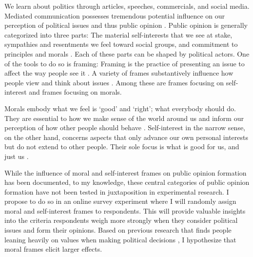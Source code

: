 \documentclass[11pt]{article}
\begin{document}
We learn about politics through articles, speeches, commercials, and social media. Mediated communication possesses tremendous potential influence on our perception of political issues and thus public opinion \citep{iyengar_framing_1996,kam_risk_2010}. Public opinion is generally categorized into three parts: The material self-interests that we see at stake, sympathies and resentments we feel toward social groups, and commitment to principles and morals \citep{kinder_1998_opinion}. Each of these parts can be shaped by political actors. One of the tools to do so is framing: Framing is the practice of presenting an issue to affect the way people see it \citep{aaroe_investigating_2011,druckman_evaluating_2001}. A variety of frames substantively influence how people view and think about issues \citep{entman_projections_2004,slothuus_political_2010,sniderman_structure_2004,chong_framing_2007-1}. Among these are frames focusing on self-interest and frames focusing on morals.

Morals embody what we feel is `good' and `right'; what everybody should do. They are essential to how we make sense of the world around us and inform our perception of how other people should behave \citep{frank_whats_2005,mooney_public_2001,zaller_nature_1992,haidt_moral_2003}. Self-interest in the narrow sense, on the other hand, concerns aspects that only advance our own personal interests but do not extend to other people. Their sole focus is what is good for us, and just us \citep{brewer_value_2001,skitka_psychology_2010,caprara_2006_personality,converse_nature_1964}. 


While the influence of moral and self-interest frames on public opinion formation has been documented, to my knowledge, these central categories of public opinion formation have not been tested in juxtaposition in experimental research. I propose to do so in an online survey experiment where I will randomly assign moral and self-interest frames to respondents. This will provide valuable insights into the criteria respondents weigh more strongly when they consider political issues and form their opinions. Based on previous research that finds people leaning heavily on values when making political decisions \citep{brader_2008_what,white_2003_values,valentino_2008_worried,transue_2007_identity,stoker_2001_political}, I hypothesize that moral frames elicit larger effects.
\end{document}
